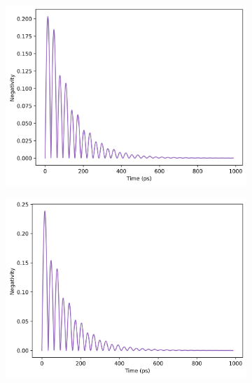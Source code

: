 \documentclass[12pt]{article}
\begin{document}
\begin{figure}[H]
    \centering
    \begin{subfigure}{0.45\textwidth}
        \centering
        \includegraphics[width=0.85\linewidth]{Research Project/Code/results/JCM/OQS_Neg_Spont_eg.png}
        \caption{}
        \label{fig:jcm_cqs_expt_eg}
    \end{subfigure}
    \hfill
    \begin{subfigure}{0.45\textwidth}
        \centering
        \includegraphics[width=0.85\linewidth]{Research Project/Code/results/JCM/OQS_Neg_Therm_eg.png}
        \caption{}
        \label{fig:jcm_cqs_vne_eg}
    \end{subfigure}
    
    \vspace{0.5cm}
    

\end{figure}
\end{document}
